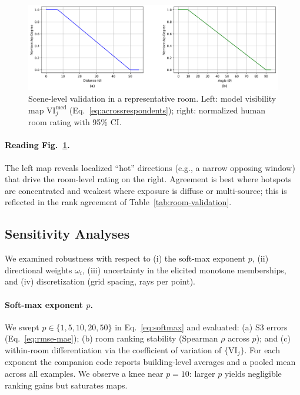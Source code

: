 \documentclass[final,3p,times,review]{elsarticle}
\begin{document}
\begin{figure}[H]
  \centering
  \includegraphics[width=.95\linewidth]{fuzzy_membership_functions.png}
  \caption{Scene-level validation in a representative room. Left: model visibility map $\mathrm{VI}_j^{\mathrm{med}}$ (Eq.~\eqref{eq:acrossrespondents}); right: normalized human room rating with 95\% CI.}
  \label{fig:vi-map-vs-rating}
\end{figure}


\paragraph{Reading Fig.~\ref{fig:vi-map-vs-rating}.}
The left map reveals localized “hot” directions (e.g., a narrow opposing window) that drive the room-level rating on the right. Agreement is best where hotspots are concentrated and weakest where exposure is diffuse or multi-source; this is reflected in the rank agreement of Table~\ref{tab:room-validation}.

\subsection{Sensitivity Analyses}
\label{sec:sensitivity}
We examined robustness with respect to (i) the soft-max exponent $p$, (ii) directional weights $\omega_i$, (iii) uncertainty in the elicited monotone memberships, and (iv) discretization (grid spacing, rays per point).

\paragraph{Soft-max exponent $p$.}
We swept $p\in\{1,5,10,20,50\}$ in Eq.~\eqref{eq:softmax} and evaluated: (a) S3 errors (Eq.~\eqref{eq:rmse-mae}); (b) room ranking stability (Spearman $\rho$ across $p$); and (c) within-room differentiation via the coefficient of variation of $\{\mathrm{VI}_j\}$. For each exponent the companion code reports building-level averages and a pooled mean across all examples. We observe a knee near $p{=}10$: larger $p$ yields negligible ranking gains but saturates maps.
\end{document}
